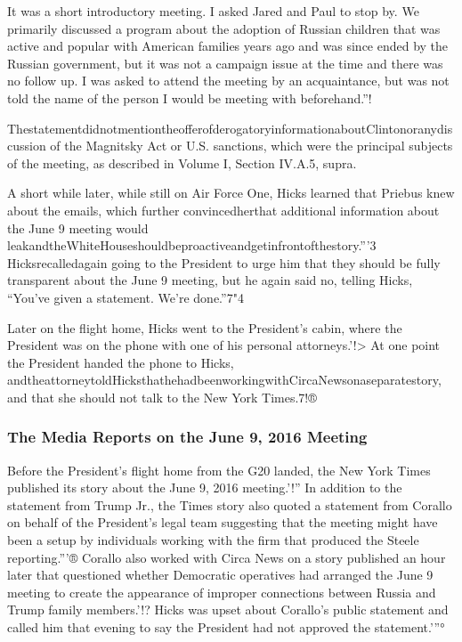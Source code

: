 It was a short introductory meeting.
I asked Jared and Paul to stop by.
We primarily discussed a program about the adoption of Russian children that was active and popular with American families years ago and was since ended by the Russian government, but it was not a campaign issue at the time and there was no follow up.
I was asked to attend the meeting by an acquaintance, but was not told the name of the person I would be meeting with beforehand.”!

ThestatementdidnotmentiontheofferofderogatoryinformationaboutClintonoranydiscussion of the Magnitsky Act or U.S. sanctions, which were the principal subjects of the meeting, as described in Volume I, Section IV.A.5, supra.

A short while later, while still on Air Force One, Hicks learned that Priebus knew about the emails, which further convincedherthat additional information about the June 9 meeting would leakandtheWhiteHouseshouldbeproactiveandgetinfrontofthestory.”'3
Hicksrecalledagain going to the President to urge him that they should be fully transparent about the June 9 meeting, but he again said no, telling Hicks, “You've given a statement.
We're done.”7"4

Later on the flight home, Hicks went to the President's cabin, where the President was on the phone with one of his personal attorneys.'!>
At one point the President handed the phone to Hicks, andtheattorneytoldHicksthathehadbeenworkingwithCircaNewsonaseparatestory, and that she should not talk to the New York Times.7!®

\subsubsection{The Media Reports on the June 9, 2016 Meeting}

Before the President's flight home from the G20 landed, the New York Times published its story about the June 9, 2016 meeting.'!”
In addition to the statement from Trump Jr., the Times story also quoted a statement from Corallo on behalf of the President's legal team suggesting that the meeting might have been a setup by individuals working with the firm that produced the Steele reporting.”'®
Corallo also worked with Circa News on a story published an hour later that questioned whether Democratic operatives had arranged the June 9 meeting to create the appearance of improper connections between Russia and Trump family members.'!?
Hicks was upset about Corallo's public statement and called him that evening to say the President had not approved the statement.'”°

